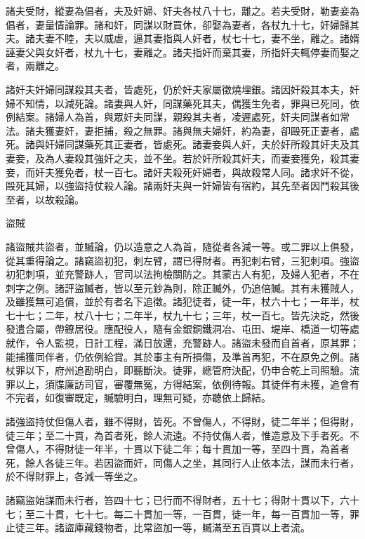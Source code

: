 \begin{pinyinscope}
 諸夫受財，縱妻為倡者，夫及奸婦、奸夫各杖八十七，離之。若夫受財，勒妻妾為倡者，妻量情論罪。諸和奸，同謀以財買休，卻娶為妻者，各杖九十七，奸婦歸其夫。諸夫妻不睦，夫以威虐，逼其妻指與人奸者，杖七十七，妻不坐，離之。諸婿誣妻父與女奸者，杖九十七，妻離之。諸夫指奸而棄其妻，所指奸夫輒停妻而娶之者，兩離之。



 諸奸夫奸婦同謀殺其夫者，皆處死，仍於奸夫家屬徵燒埋銀。諸因奸殺其本夫，奸婦不知情，以減死論。諸妻與人奸，同謀藥死其夫，偶獲生免者，罪與已死同，依例結案。諸婦人為首，與眾奸夫同謀，親殺其夫者，凌遲處死，奸夫同謀者如常法。諸夫獲妻奸，妻拒捕，殺之無罪。諸與無夫婦奸，約為妻，卻毆死正妻者，處死。諸與奸婦同謀藥死其正妻者，皆處死。諸妻妾與人奸，夫於奸所殺其奸夫及其妻妾，及為人妻殺其強奸之夫，並不坐。若於奸所殺其奸夫，而妻妾獲免，殺其妻妾，而奸夫獲免者，杖一百七。諸奸夫殺死奸婦者，與故殺常人同。諸求奸不從，毆死其婦，以強盜持仗殺人論。諸兩奸夫與一奸婦皆有宿約，其先至者因鬥殺其後至者，以故殺論。



 盜賊



 諸盜賊共盜者，並贓論，仍以造意之人為首，隨從者各減一等。或二罪以上俱發，從其重得論之。諸竊盜初犯，刺左臂，謂已得財者。再犯刺右臂，三犯刺項。強盜初犯刺項，並充警跡人，官司以法拘檢關防之。其蒙古人有犯，及婦人犯者，不在刺字之例。諸評盜贓者，皆以至元鈔為則，除正贓外，仍追倍贓。其有未獲賊人，及雖獲無可追償，並於有者名下追徵。諸犯徒者，徒一年，杖六十七；一年半，杖七十七；二年，杖八十七；二年半，杖九十七；三年，杖一百七。皆先決訖，然後發遣合屬，帶鐐居役。應配役人，隨有金銀銅鐵洞冶、屯田、堤岸、橋道一切等處就作，令人監視，日計工程，滿日放還，充警跡人。諸盜未發而自首者，原其罪；能捕獲同伴者，仍依例給賞。其於事主有所損傷，及準首再犯，不在原免之例。諸杖罪以下，府州追勘明白，即聽斷決。徒罪，總管府決配，仍申合乾上司照驗。流罪以上，須牒廉訪司官，審覆無冤，方得結案，依例待報。其徒伴有未獲，追會有不完者，如復審既定，贓驗明白，理無可疑，亦聽依上歸結。



 諸強盜持仗但傷人者，雖不得財，皆死。不曾傷人，不得財，徒二年半；但得財，徒三年；至二十貫，為首者死，餘人流遠。不持仗傷人者，惟造意及下手者死。不曾傷人，不得財徒一年半，十貫以下徒二年；每十貫加一等，至四十貫，為首者死，餘人各徒三年。若因盜而奸，同傷人之坐，其同行人止依本法，謀而未行者，於不得財罪上，各減一等坐之。



 諸竊盜始謀而未行者，笞四十七；已行而不得財者，五十七；得財十貫以下，六十七；至二十貫，七十七。每二十貫加一等，一百貫，徒一年，每一百貫加一等，罪止徒三年。諸盜庫藏錢物者，比常盜加一等，贓滿至五百貫以上者流。




\end{pinyinscope}
